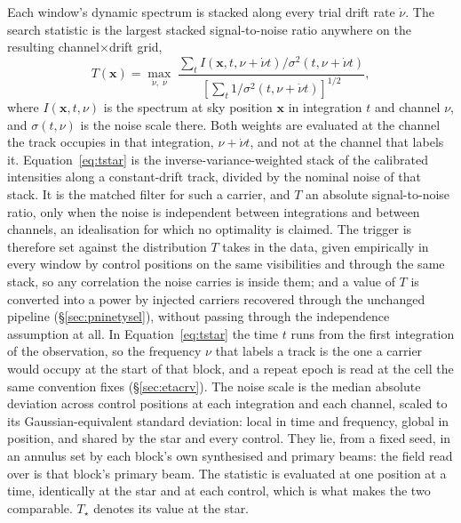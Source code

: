 Each window's dynamic spectrum is stacked along every trial drift rate
$\dot\nu$. The search statistic is the largest stacked signal-to-noise
ratio anywhere on the resulting channel$\times$drift grid,
%
\begin{equation}
T(\mathbf{x})=\max_{\dot\nu,\;\nu}\;
\frac{\sum_{t} I\!\left(\mathbf{x},t,\nu+\dot\nu t\right)
       \big/\sigma^{2}(t,\nu+\dot\nu t)}
     {\left[\sum_{t}1\big/\sigma^{2}(t,\nu+\dot\nu t)\right]^{1/2}},
\label{eq:tstar}
\end{equation}
%
where $I(\mathbf{x},t,\nu)$ is the spectrum at sky position $\mathbf{x}$
in integration $t$ and channel $\nu$, and $\sigma(t,\nu)$ is the noise scale
there. Both weights are evaluated at the channel the track occupies in that
integration, $\nu+\dot\nu t$, and not at the channel that labels it. Equation~\ref{eq:tstar} is the inverse-variance-weighted stack of the
calibrated intensities along a constant-drift track, divided by the nominal
noise of that stack. It is the matched filter for such a carrier, and $T$ an
absolute signal-to-noise ratio, only when the noise is independent between
integrations and between channels, an idealisation for which no optimality is
claimed. The trigger is therefore set against the distribution $T$ takes in
the data, given empirically in every window by \NCtrl{} control positions on
the same visibilities and through the same stack, so any correlation the noise
carries is inside them; and a value of $T$ is converted into a power by
injected carriers recovered through the unchanged pipeline
(\S\ref{sec:pninetysel}), without passing through the independence assumption
at all. In Equation~\ref{eq:tstar} the time $t$ runs from the first integration of the
observation, so the frequency $\nu$ that labels a track is the one a carrier
would occupy at the start of that block, and a repeat epoch is read at the
cell the same convention fixes (\S\ref{sec:etacrv}).
The noise scale is the median absolute deviation
across \NCtrl{} control positions at each integration and each channel,
scaled to its Gaussian-equivalent standard deviation: local in time and
frequency, global in position, and shared by the star and every control.
They lie, from a fixed seed, in an annulus set by each block's own
synthesised and primary beams: the field read over is that block's primary
beam.
The statistic is evaluated at one position at a time, identically at the
star and at each control, which is what makes the two comparable.
$T_\star$ denotes its value at the star.


